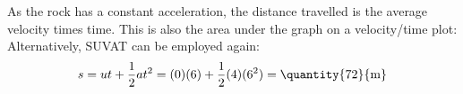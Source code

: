 \begin{problem}[O1979PIIQ3a]
{\begin{enumerate}
As the rock has a constant acceleration, the distance travelled is the average velocity times time. This is also the area under the graph on a velocity/time plot: 
Alternatively, SUVAT can be employed again:
	\begin{equation*}
	s = ut + \frac{1}{2}at^{2} = (0)(6) + \frac{1}{2}(4)(6^{2}) = \mbox{\quantity{72}{m}} 
	\end{equation*}

\end{enumerate}
}
\end{problem}